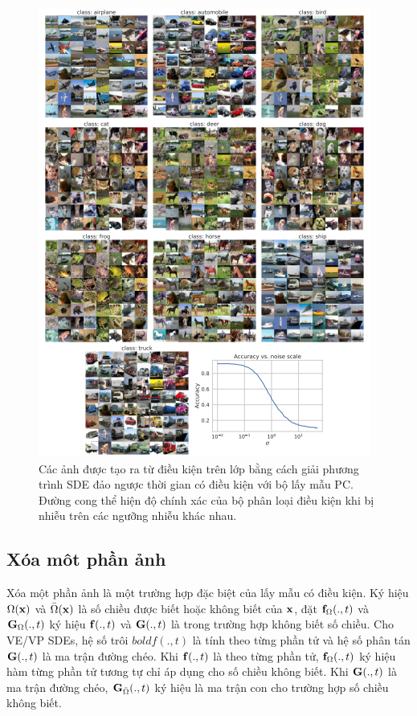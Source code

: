 \documentclass{article} %
\begin{document}
\begin{figure}[h!]
    \centering
    \includegraphics[height=0.8\textheight]{figures/13.png}
    \caption{Các ảnh được tạo ra từ điều kiện trên lớp bằng cách giải phương trình SDE đảo ngược thời gian có điều kiện với bộ lấy mẫu PC.
    Đường cong thể hiện độ chính xác của bộ phân loại điều kiện khi bị nhiễu trên các ngưỡng nhiễu khác nhau.}
    \label{fig:13}
\end{figure}

\subsection{Xóa môt phần ảnh} \label{I.2}

Xóa một phần ảnh là một trường hợp đặc biệt của lấy mẫu có điều kiện.
Ký hiệu $\Omega(\bold{x})$ và $\bar{\Omega}(\bold{x})$ là số chiều được biết hoặc không biết của $\bold{x}$,
đặt $\bold{f}_{\Omega}(., t)$ và $\bold{G}_{\Omega}(., t)$ ký hiệu $\bold{f}(., t)$ và $\bold{G}(., t)$ là trong trường hợp không biết số chiều.
Cho VE/VP SDEs, hệ số trôi $bold{f}(., t)$ là tính theo từng phần tử và hệ số phân tán $\bold{G}(., t)$ là ma trận đường chéo.
Khi $\bold{f}(., t)$ là theo từng phần tử, $\bold{f}_{\Omega}(., t)$ ký hiệu hàm từng phần tử tương tự chỉ áp dụng cho số chiều không biết.
Khi $\bold{G}(., t)$ là ma trận đường chéo, $\bold{G}_{\bar{\Omega}}(., t)$ ký hiệu là ma trận con cho trường hợp số chiều không biết.
\end{document}
